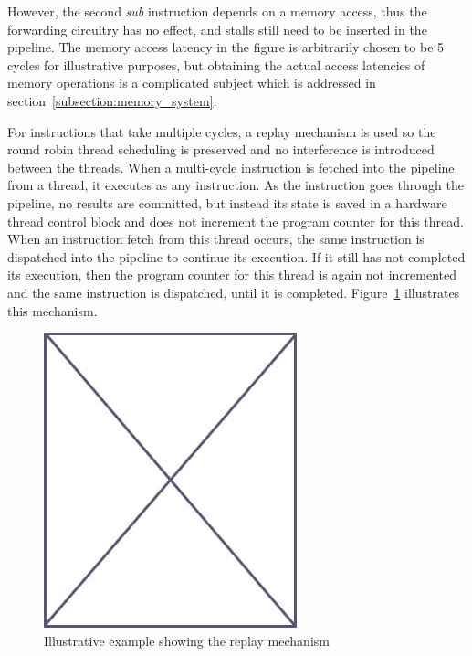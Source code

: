 However, the second \emph{sub} instruction depends on a memory access, thus the forwarding circuitry has no effect, and stalls still need to be inserted in the pipeline.
The memory access latency in the figure is arbitrarily chosen to be 5 cycles for illustrative purposes, but obtaining the actual access latencies of memory operations is a complicated subject which is addressed in section~\ref{subsection:memory_system}.


For instructions that take multiple cycles, a replay mechanism is used so the round robin thread scheduling is preserved and no interference is introduced between the threads.
When a multi-cycle instruction is fetched into the pipeline from a thread, it executes as any instruction.
As the instruction goes through the pipeline, no results are committed, but instead its state is saved in a hardware thread control block and does not increment the program counter for this thread. 
When an instruction fetch from this thread occurs, the same instruction is dispatched into the pipeline to continue its execution. 
If it still has not completed its execution, then the program counter for this thread is again not incremented and the same instruction is dispatched, until it is completed. 
Figure~\ref{fig:replay_mechanism_example} illustrates this mechanism.
\begin{figure}
\begin{center}
\includegraphics[scale=.4]{figs/placeholder}
\end{center}
\caption{Illustrative example showing the replay mechanism}
\label{fig:replay_mechanism_example}
\end{figure}

